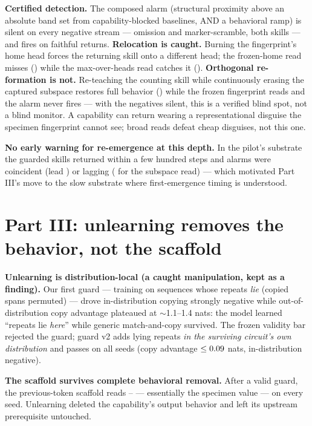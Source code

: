\documentclass[11pt]{article}
\begin{document}
\textbf{Certified detection.} The composed alarm (structural proximity above an
absolute band set from capability-blocked baselines, AND a behavioral ramp) is silent
on every negative stream --- omission and marker-scramble, both skills --- and fires
on faithful returns. \textbf{Relocation is caught.} Burning the fingerprint's home
head forces the returning skill onto a different head; the frozen-home read misses
(\PilotRelocHome) while the max-over-heads read catches it (\PilotRelocMax).
\textbf{Orthogonal re-formation is not.} Re-teaching the counting skill while
continuously erasing the captured subspace restores full behavior
(\PilotIdioFinalAcc) while the frozen fingerprint reads \PilotIdioFinalStruct{} and
the alarm never fires --- with the negatives silent, this is a verified blind spot,
not a blind monitor. A capability can return wearing a representational disguise the
specimen fingerprint cannot see; broad reads defeat cheap disguises, not this one.

\textbf{No early warning for re-emergence at this depth.} In the pilot's substrate
the guarded skills returned within a few hundred steps and alarms were coincident
(lead \PilotFaithLeadMzero) or lagging (\PilotFaithLeadMsix{} for the subspace read)
--- which motivated Part III's move to the slow substrate where first-emergence
timing is understood.

\section{Part III: unlearning removes the behavior, not the scaffold}
\label{sec:p8r2}
\textbf{Unlearning is distribution-local (a caught manipulation, kept as a
finding).} Our first guard --- training on sequences whose repeats \emph{lie}
(copied spans permuted) --- drove in-distribution copying strongly negative while
out-of-distribution copy advantage plateaued at $\sim$1.1--1.4 nats: the model
learned ``repeats lie \emph{here}'' while generic match-and-copy survived. The
frozen validity bar rejected the guard; guard v2 adds lying repeats \emph{in the
surviving circuit's own distribution} and passes on all seeds
(copy advantage $\le 0.09$ nats, in-distribution negative).

\textbf{The scaffold survives complete behavioral removal.} After a valid guard, the
previous-token scaffold reads \RtwoScaffoldLo--\RtwoScaffoldHi{} --- essentially the
specimen value --- on every seed. Unlearning deleted the capability's output
behavior and left its upstream prerequisite untouched.
\end{document}

